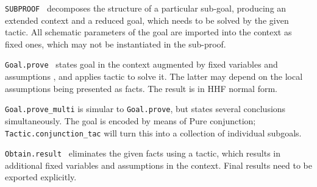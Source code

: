 \begin{isabellebody}
\begin{isamarkuptext}
  \begin{description}

  \item \verb|SUBPROOF|~ decomposes the structure of a
  particular sub-goal, producing an extended context and a reduced
  goal, which needs to be solved by the given tactic.  All schematic
  parameters of the goal are imported into the context as fixed ones,
  which may not be instantiated in the sub-proof.

  \item \verb|Goal.prove|~ states goal  in the context augmented by fixed variables  and
  assumptions , and applies tactic  to solve
  it.  The latter may depend on the local assumptions being presented
  as facts.  The result is in HHF normal form.

  \item \verb|Goal.prove_multi| is simular to \verb|Goal.prove|, but
  states several conclusions simultaneously.  The goal is encoded by
  means of Pure conjunction; \verb|Tactic.conjunction_tac| will turn
  this into a collection of individual subgoals.

  \item \verb|Obtain.result|~ eliminates the
  given facts using a tactic, which results in additional fixed
  variables and assumptions in the context.  Final results need to be
  exported explicitly.

  \end{description}%
\end{isamarkuptext}%
\isamarkuptrue%
%
\endisatagmlref
{\isafoldmlref}%
%
\isadelimmlref
%
\endisadelimmlref
%
\isadelimtheory
%
\endisadelimtheory
%
\isatagtheory
{}\isamarkupfalse%
%
\endisatagtheory
{\isafoldtheory}%
%
\isadelimtheory
%
\endisadelimtheory
\isanewline
\end{isabellebody}%
